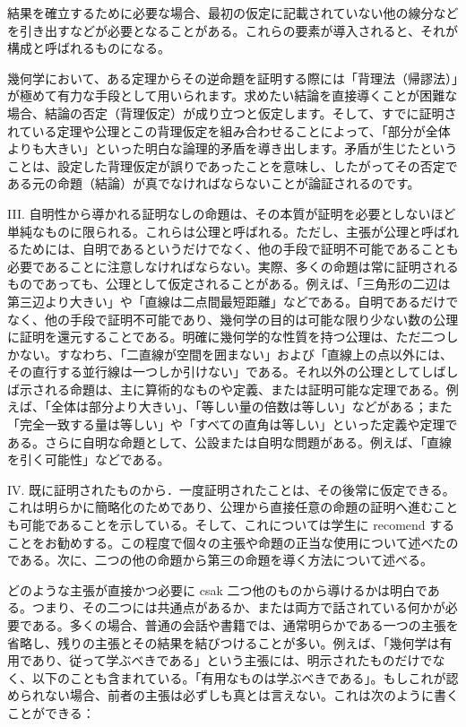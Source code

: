\documentclass[a4paper,11pt,openany]{ltjsbook}
\begin{document}
結果を確立するために必要な場合、最初の仮定に記載されていない他の線分などを引き出すなどが必要となることがある。これらの要素が導入されると、それが構成と呼ばれるものになる。

幾何学において、ある定理からその逆命題を証明する際には「背理法（帰謬法）」が極めて有力な手段として用いられます。求めたい結論を直接導くことが困難な場合、結論の否定（背理仮定）が成り立つと仮定します。そして、すでに証明されている定理や公理とこの背理仮定を組み合わせることによって、「部分が全体よりも大きい」といった明白な論理的矛盾を導き出します。矛盾が生じたということは、設定した背理仮定が誤りであったことを意味し、したがってその否定である元の命題（結論）が真でなければならないことが論証されるのです。

III. 自明性から導かれる証明なしの命題は、その本質が証明を必要としないほど単純なものに限られる。これらは公理と呼ばれる。ただし、主張が公理と呼ばれるためには、自明であるというだけでなく、他の手段で証明不可能であることも必要であることに注意しなければならない。実際、多くの命題は常に証明されるものであっても、公理として仮定されることがある。例えば、「三角形の二辺は第三辺より大きい」や「直線は二点間最短距離」などである。自明であるだけでなく、他の手段で証明不可能であり、幾何学の目的は可能な限り少ない数の公理に証明を還元することである。明確に幾何学的な性質を持つ公理は、ただ二つしかない。すなわち、「二直線が空間を囲まない」および「直線上の点以外には、その直行する並行線は一つしか引けない」である。それ以外の公理としてしばしば示される命題は、主に算術的なものや定義、または証明可能な定理である。例えば、「全体は部分より大きい」、「等しい量の倍数は等しい」などがある；また「完全一致する量は等しい」や「すべての直角は等しい」といった定義や定理である。さらに自明な命題として、公設または自明な問題がある。例えば、「直線を引く可能性」などである。

IV. 既に証明されたものから．一度証明されたことは、その後常に仮定できる。これは明らかに簡略化のためであり、公理から直接任意の命題の証明へ進むことも可能であることを示している。そして、これについては学生に recomend することをお勧めする。この程度で個々の主張や命題の正当な使用について述べたのである。次に、二つの他の命題から第三の命題を導く方法について述べる。

どのような主張が直接かつ必要に csak 二つ他のものから導けるかは明白である。つまり、その二つには共通点があるか、または両方で話されている何かが必要である。多くの場合、普通の会話や書籍では、通常明らかである一つの主張を省略し、残りの主張とその結果を結びつけることが多い。例えば、「幾何学は有用であり、従って学ぶべきである」という主張には、明示されたものだけでなく、以下のことも含まれている。「有用なものは学ぶべきである」。もしこれが認められない場合、前者の主張は必ずしも真とは言えない。これは次のように書くことができる：
\end{document}
